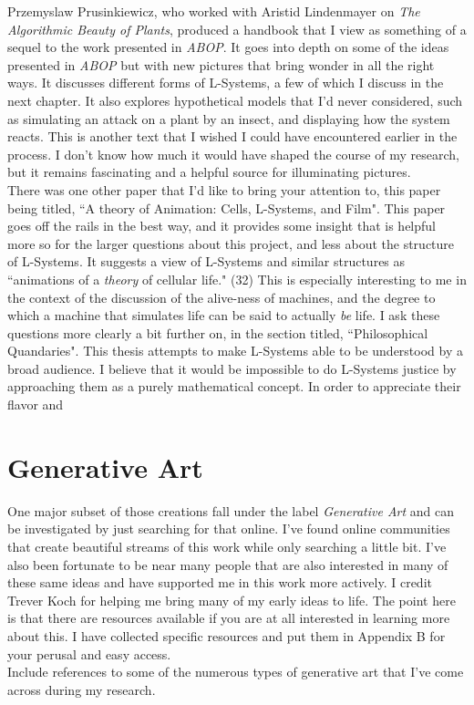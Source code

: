 \documentclass[12pt,twoside]{reedthesis}
\begin{document}
	Przemyslaw Prusinkiewicz, who worked with Aristid Lindenmayer on \textit{The Algorithmic Beauty of Plants}, produced a handbook that I view as something of a sequel to the work presented in \textit{ABOP}. It goes into depth on some of the ideas presented in \textit{ABOP} but with new pictures that bring wonder in all the right ways. It discusses different forms of L-Systems, a few of which I discuss in the next chapter. It also explores hypothetical models that I'd never considered, such as simulating an attack on a plant by an insect, and displaying how the system reacts. This is another text that I wished I could have encountered earlier in the process. I don't know how much it would have shaped the course of my research, but it remains fascinating and a helpful source for illuminating pictures.\\
	
	There was one other paper that I'd like to bring your attention to, this paper being titled, ``A theory of Animation: Cells, L-Systems, and Film". This paper goes off the rails in the best way, and it provides some insight that is helpful more so for the larger questions about this project, and less about the structure of L-Systems. It suggests a view of L-Systems and similar structures as ``animations of a \textit{theory} of cellular life." (32) This is especially interesting to me in the context of the discussion of the alive-ness of machines, and the degree to which a machine that simulates life can be said to actually \textit{be} life. I ask these questions more clearly a bit further on, in the section titled, ``Philosophical Quandaries". This thesis attempts to make L-Systems able to be understood by a broad audience. I believe that it would be impossible to do L-Systems justice by approaching them as a purely mathematical concept. In order to appreciate their flavor and 

\section{Generative Art}
One major subset of those creations fall under the label \textit{Generative Art} and can be investigated by just searching for that online. I've found online communities that create beautiful streams of this work while only searching a little bit. I've also been fortunate to be near many people that are also interested in many of these same ideas and have supported me in this work more actively. I credit Trever Koch for helping me bring many of my early ideas to life. The point here is that there are resources available if you are at all interested in learning more about this. I have collected specific resources and put them in Appendix B for your perusal and easy access.\\
Include references to some of the numerous types of generative art that I've come across during my research. 
\end{document}
